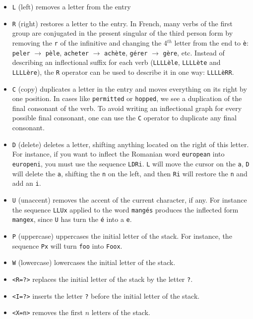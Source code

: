\begin{itemize}
  \item \verb+L+ (left) removes a letter from the entry
  
  \item \verb+R+ (right) restores a letter to the entry. In French, many verbs
  of the first group are conjugated in the present singular  of the third person form  by removing the
  \verb+r+ of the infinitive and changing the 4$^{th}$ letter from the end to
  \texttt{\`e}: \verb+peler+ $\rightarrow$ \texttt{p\`ele},
  \verb+acheter+ $\rightarrow$ \texttt{ach\`ete}, \texttt{g\'erer}
  $\rightarrow$ \texttt{g\`ere}, etc. Instead of describing an inflectional
  suffix for each verb (\texttt{LLLL\`ele}, \texttt{LLLL\`ete} and
  \texttt{LLLL\`ere}), the \verb+R+ operator can be used to
  describe it in one way: \texttt{LLLL\`eRR}.
  
  \item \verb+C+ (copy) duplicates a letter in the entry and moves everything on
  its right by one position. In cases like \verb+permitted+ or \verb+hopped+, we
  see a duplication of the final consonant of the verb. To avoid writing an
  inflectional graph for every possible final consonant, one can use the \verb+C+
  operator to duplicate any final consonant.
  
  \item \verb+D+ (delete) deletes a
  letter, shifting anything located on the right of this letter. For instance, if
  you want to inflect the Romanian word \verb+european+ into \verb+europeni+, you
  must use the sequence \verb+LDRi+. \verb+L+ will move the cursor on the
  \verb+a+, \verb+D+ will delete the \verb+a+, shifting the \verb+n+ on the left,
  and then \verb+Ri+ will restore the \verb+n+ and add an \verb+i+.

  \item \verb+U+ (unaccent) removes the accent of the current character, if
  any. For instance the sequence \verb+LLUx+ applied to the word
  \texttt{mang\'es} produces the inflected form \verb+mangex+, since \verb+U+
  has turn the \texttt{\'e} into a \verb+e+.

  \item \verb+P+ (uppercase) uppercases the initial letter of the stack. For
  instance, the sequence \verb$Px$ will turn \verb$foo$ into \verb$Foox$.
  
  \item \verb+W+ (lowercase) lowercases the initial letter of the stack.

  \item \verb+<R=?>+ replaces the initial letter of the stack by the letter \verb+?+.

  \item \verb+<I=?>+ inserts the letter \verb+?+ before the initial letter of the stack. 

  \item \verb+<X=n>+ removes the first $n$ letters of the stack. 
   
\end{itemize}

